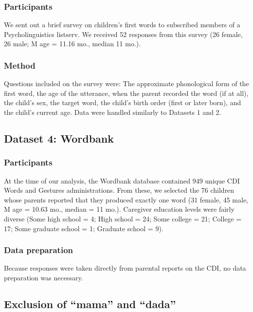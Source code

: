 \documentclass[10pt,letterpaper]{article}
\begin{document}
\subsubsection{Participants}

We sent out a brief survey on children's first words to subscribed members of a Psycholinguistics listserv. We received 52 responses from this survey (26 female, 26 male; M age = 11.16 mo., median 11 mo.).

\subsubsection{Method}

Questions included on the survey were: The approximate phonological form of the first word, the age of the utterance, when the parent recorded the word (if at all), the child's sex, the target word, the child's birth order (first or later born), and the child's current age. Data were handled similarly to Datasets 1 and 2. 

\subsection{Dataset 4: Wordbank}

\subsubsection{Participants}

At the time of our analysis, the Wordbank database contained 949 unique CDI Words and Gestures administrations. From these, we selected the 76 children whose parents reported that they produced exactly one word (31 female, 45 male, M age = 10.63 mo., median = 11 mo.). Caregiver education levels were fairly diverse (Some high school = 4; High school = 24; Some college = 21; College = 17; Some graduate school = 1; Graduate school = 9). 

\subsubsection{Data preparation}

Because responses were taken directly from parental reports on the CDI, no data preparation was necessary.


\subsection{Exclusion of ``mama'' and ``dada''}
\end{document}
